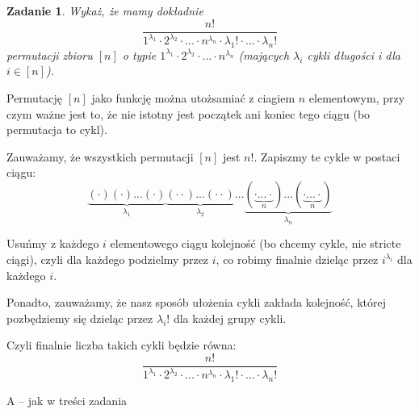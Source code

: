 \documentclass{mwbk}
\newtheorem{zad}{Zadanie}[chapter]
\begin{document}
\begin{zad}
    Wykaż, że mamy dokładnie
    \[\frac{n!}{1^{\lambda_1} \cdot 2^{\lambda_2} \cdot  ... \cdot n^{\lambda_n} \cdot \lambda_1! \cdot ... \cdot \lambda_n!}\]
    permutacji zbioru $[n]$ o typie $1^{\lambda_1} \cdot 2^{\lambda_2} \cdot ... \cdot n^{\lambda_n} $  (mających $\lambda_i$ cykli długości i dla $i \in [n]$).
\end{zad}
\begin{mdframed}
    Permutację $[n]$ jako funkcję można utożsamiać z ciagiem $n$ elementowym,
    przy czym ważne jest to, że nie istotny jest początek ani koniec tego ciągu
    (bo permutacja to cykl).

    Zauważamy, że wszystkich permutacji $[n]$ jest $n!$.
    Zapiszmy te cykle w postaci ciągu:
    \[\underbrace{(\cdot)(\cdot) ... (\cdot)}_{\lambda_1}\underbrace{(\cdot \cdot)...(\cdot \cdot)}_{\lambda_2} ... \underbrace{(\underbrace{\cdot ... \cdot}_{n})...(\underbrace{\cdot ... \cdot}_{n})}_{\lambda_n}\]

    Usuńmy z każdego $i$ elementowego ciągu kolejność
    (bo chcemy cykle, nie stricte ciągi), czyli dla każdego podzielmy przez $i$,
    co robimy finalnie dzieląc przez $i^{\lambda_i}$ dla każdego $i$.

    Ponadto, zauważamy, że nasz sposób ułożenia cykli zakłada kolejność,
    której pozbędziemy się dzieląc przez $\lambda_i!$ dla każdej grupy cykli.

    Czyli finalnie liczba takich cykli będzie równa:
    \[\frac{n!}{1^{\lambda_1} \cdot 2^{\lambda_2} \cdot  ... \cdot n^{\lambda_n} \cdot \lambda_1! \cdot ... \cdot \lambda_n!}\]

\end{mdframed}
\begin{mdframed}
    A -- jak w treści zadania
\end{mdframed}
\end{document}
